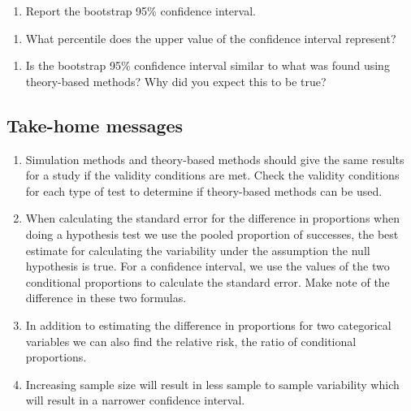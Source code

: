 \documentclass[
]{report}
\providecommand{\tightlist}{%
  \setlength{\itemsep}{0pt}\setlength{\parskip}{0pt}}
\begin{document}
\begin{enumerate}
\def\labelenumi{\arabic{enumi}.}
\setcounter{enumi}{1}
\tightlist
\item
  Report the bootstrap 95\% confidence interval.
\end{enumerate}

\vspace{0.5in}

\begin{enumerate}
\def\labelenumi{\arabic{enumi}.}
\setcounter{enumi}{2}
\tightlist
\item
  What percentile does the upper value of the confidence interval represent?
\end{enumerate}

\vspace{0.3in}

\begin{enumerate}
\def\labelenumi{\arabic{enumi}.}
\setcounter{enumi}{3}
\tightlist
\item
  Is the bootstrap 95\% confidence interval similar to what was found using theory-based methods? Why did you expect this to be true?
\end{enumerate}

\vspace{0.5in}

\hypertarget{take-home-messages-8}{%
\subsection{Take-home messages}\label{take-home-messages-8}}

\begin{enumerate}
\def\labelenumi{\arabic{enumi}.}
\item
  Simulation methods and theory-based methods should give the same results for a study if the validity conditions are met. Check the validity conditions for each type of test to determine if theory-based methods can be used.
\item
  When calculating the standard error for the difference in proportions when doing a hypothesis test we use the pooled proportion of successes, the best estimate for calculating the variability under the assumption the null hypothesis is true. For a confidence interval, we use the values of the two conditional proportions to calculate the standard error. Make note of the difference in these two formulas.
\item
  In addition to estimating the difference in proportions for two categorical variables we can also find the relative risk, the ratio of conditional proportions.
\item
  Increasing sample size will result in less sample to sample variability which will result in a narrower confidence interval.
\end{enumerate}
\end{document}
